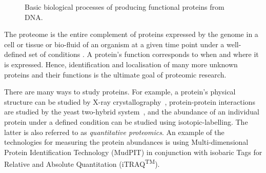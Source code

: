 \documentclass[11pt,a4paper]{article}
\begin{document}
\begin{figure}[hbt]
\caption{Basic biological processes of producing functional proteins from DNA.}
\label{fig:processes}
\end{figure}

The proteome is the entire complement of proteins expressed by the genome in a cell or tissue or bio-fluid of an organism at a given time point under a well-defined set of conditions \citep{Boehm2007}. A protein's function corresponds to when and where it is expressed. Hence, identification and localisation of many more unknown proteins and their functions is the ultimate goal of proteomic research. 

There are many ways to study proteins. For example, a protein's physical structure can be studied by X-ray crystallography~\citep{Blow2002}, protein-protein interactions are studied by the yeast two-hybrid system~\citep{Fields1989}, and the abundance of an individual protein under a defined condition can be studied using isotopic-labelling. The latter is also referred to as \emph{quantitative proteomics}. An example of the technologies for measuring the protein abundances is using Multi-dimensional Protein Identification Technology (MudPIT) in conjunction with isobaric Tags for Relative and Absolute Quantitation (iTRAQ\textsuperscript{TM}). 

\end{document}
